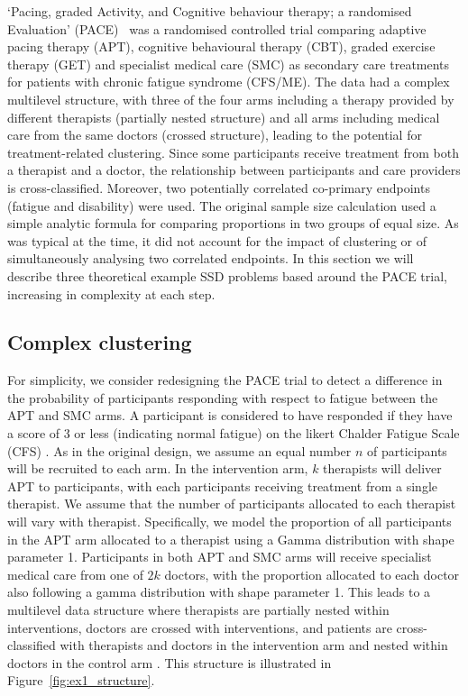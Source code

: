 \documentclass[sagev, doublespace, Crown]{sagej}
\begin{document}
`Pacing, graded Activity, and Cognitive behaviour therapy; a randomised Evaluation' (PACE)~\cite{White2007, White2011} was a randomised controlled trial comparing adaptive pacing therapy (APT), cognitive behavioural therapy (CBT), graded exercise therapy (GET) and specialist medical care (SMC) as secondary care treatments for patients with chronic fatigue syndrome (CFS/ME). The data had a complex multilevel structure, with three of the four arms including a therapy provided by different therapists (partially nested structure) and all arms including medical care from the same doctors (crossed structure), leading to the potential for treatment-related clustering. Since some participants receive treatment from both a therapist and a doctor, the relationship between participants and care providers is cross-classified. Moreover, two potentially correlated co-primary endpoints (fatigue and disability) were used. The original sample size calculation used a simple analytic formula for comparing proportions in two groups of equal size. As was typical at the time, it did not account for the impact of clustering or of simultaneously analysing two correlated endpoints. In this section we will describe three theoretical example SSD problems based around the PACE trial, increasing in complexity at each step. 

\subsection{Complex clustering}\label{sec:ex1}

For simplicity, we consider redesigning the PACE trial to detect a difference in the probability of participants responding with respect to fatigue between the APT and SMC arms. A participant is considered to have responded if they have a score of 3 or less (indicating normal fatigue) on the likert Chalder Fatigue Scale (CFS) \cite{Chalder1993}. As in the original design, we assume an equal number $n$ of participants will be recruited to each arm. In the intervention arm, $k$ therapists will deliver APT to participants, with each participants receiving treatment from a single therapist. We assume that the number of participants allocated to each therapist will vary with therapist. Specifically, we model the proportion of all participants in the APT arm allocated to a therapist using a Gamma distribution with shape parameter 1. Participants in both APT and SMC arms will receive specialist medical care from one of $2k$ doctors, with the proportion allocated to each doctor also following a gamma distribution with shape parameter 1. This leads to a multilevel data structure where therapists are partially nested within interventions, doctors are crossed with interventions, and patients are cross-classified with therapists and doctors in the intervention arm and nested within doctors in the control arm \cite{Walwyn2010}. This structure is illustrated in Figure~\ref{fig:ex1_structure}.
\end{document}

